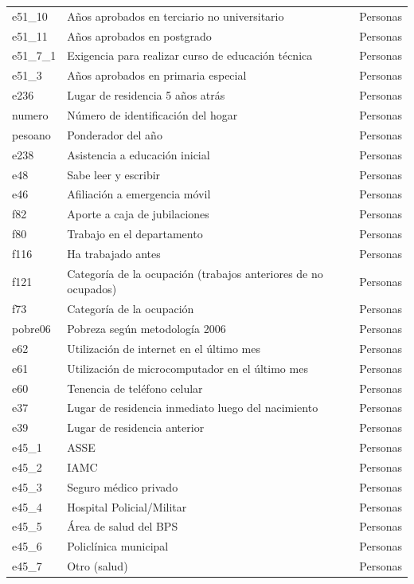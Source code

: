 \documentclass[12pt,twoside,spanish,a4paper]{book}\usepackage[]{graphicx}\usepackage[]{color}
\begin{document}
\begin{appendix}
\begin{longtable}{p{1in}p{3.7in}p{1.3in}}
  e51\_10 & Años aprobados en terciario no universitario & Personas \\ 
  e51\_11 & Años aprobados en postgrado & Personas \\ 
  e51\_7\_1 & Exigencia para realizar curso de educación técnica & Personas \\ 
  e51\_3 & Años aprobados en primaria especial & Personas \\ 
  e236 & Lugar de residencia 5 años atrás & Personas \\ 
  numero & Número de identificación del hogar & Personas \\ 
  pesoano & Ponderador del año & Personas \\ 
  e238 & Asistencia a educación inicial & Personas \\ 
  e48 & Sabe leer y escribir & Personas \\ 
  e46 & Afiliación a emergencia móvil & Personas \\ 
  f82 & Aporte a caja de jubilaciones & Personas \\ 
  f80 & Trabajo en el departamento & Personas \\ 
  f116 & Ha trabajado antes & Personas \\ 
  f121 & Categoría de la ocupación (trabajos anteriores de no ocupados) & Personas \\ 
  f73 & Categoría de la ocupación & Personas \\ 
  pobre06 & Pobreza según metodología 2006 & Personas \\ 
  e62 & Utilización de internet en el último mes & Personas \\ 
  e61 & Utilización de microcomputador en el último mes & Personas \\ 
  e60 & Tenencia de teléfono celular & Personas \\ 
  e37 & Lugar de residencia inmediato luego del nacimiento & Personas \\ 
  e39 & Lugar de residencia anterior & Personas \\ 
  e45\_1 & ASSE & Personas \\ 
  e45\_2 & IAMC & Personas \\ 
  e45\_3 & Seguro médico privado & Personas \\ 
  e45\_4 & Hospital Policial/Militar & Personas \\ 
  e45\_5 & Área de salud del BPS & Personas \\ 
  e45\_6 & Policlínica municipal & Personas \\ 
  e45\_7 & Otro (salud) & Personas \\ 

\end{longtable}
\end{appendix}
\end{document}

